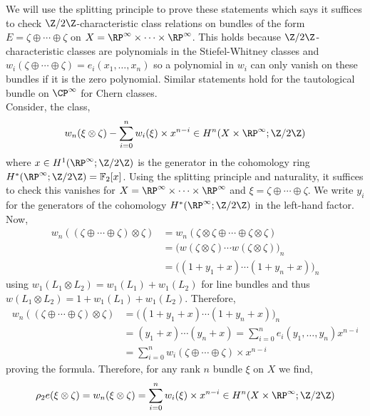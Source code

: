 \documentclass[12pt]{extarticle}
\newcommand{\F}{\mathbb{F}}
\begin{document}
We will use the splitting principle to prove these statements which says it suffices to check $\Z / 2 \Z$-characteristic class relations on bundles of the form $E = \zeta \oplus \cdots \oplus \zeta$ on $X = \RP^\infty \times \cdots \times \RP^\infty$. This holds because $\Z/2\Z$-characteristic classes are polynomials in the Stiefel-Whitney classes and $w_i(\zeta \oplus \cdots \oplus \zeta) = e_i(x_1, \dots, x_n)$ so a polynomial in $w_i$ can only vanish on these bundles if it is the zero polynomial. Similar statements hold for the tautological bundle on $\CP^\infty$ for Chern classes.
\bigskip\\
Consider, the class,
\begin{align*}
w_n(\xi \otimes \zeta) - \sum_{i = 0}^{n} w_i(\xi) \times x^{n-i} \in H^n(X \times \RP^\infty; \Z /2 \Z) 
\end{align*}
where $x \in H^1(\RP^\infty; \Z/2\Z)$ is the generator in the cohomology ring $H^*(\RP^\infty; \Z / 2 \Z) = \F_2[x]$.
Using the splitting principle and naturality, it suffices to check this vanishes for $X = \RP^\infty \times \cdots \times \RP^\infty$ and $\xi = \zeta \oplus \cdots \oplus \zeta$. We write $y_i$ for the generators of the cohomology $H^*(\RP^\infty; \Z/2\Z)$ in the left-hand factor. Now,
\begin{align*}
w_n \left( (\zeta \oplus \cdots \oplus \zeta) \otimes \zeta \right) & = w_n(\zeta \otimes \zeta \oplus \cdots \oplus \zeta \otimes \zeta)
\\
& = \big( w(\zeta \otimes \zeta) \cdots w(\zeta \otimes \zeta) \big)_n
\\
& = \big( (1 + y_1 + x) \cdots (1 + y_n + x) \big)_n
\end{align*}
using $w_1(L_1 \otimes L_2) = w_1(L_1) + w_1(L_2)$ for line bundles and thus $w(L_1 \otimes L_2) = 1 + w_1(L_1) + w_1(L_2)$. 
Therefore,
\begin{align*}
w_n \left( (\zeta \oplus \cdots \oplus \zeta) \otimes \zeta \right) & = \big( (1 + y_1 + x) \cdots (1 + y_n + x) \big)_n
\\
& = (y_1 + x) \cdots (y_n + x) = \sum_{i = 0}^n e_i(y_1, \dots, y_n) x^{n-i} 
\\
& = \sum_{i = 0}^n w_i(\zeta \oplus \cdots \oplus \zeta) \times x^{n-i} 
\end{align*}
proving the formula.
Therefore, for any rank $n$ bundle $\xi$ on $X$ we find,
\[ \rho_2 e(\xi \otimes \zeta) = w_n(\xi \otimes \zeta) = \sum_{i = 0}^n w_i(\xi) \times x^{n-i} \in H^n(X \times \RP^\infty; \Z / 2 \Z) \]
\bigskip\\
\end{document}

